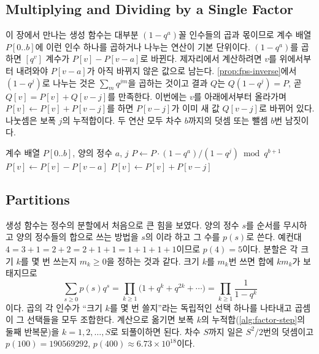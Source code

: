 \subsection{Multiplying and Dividing by a Single Factor}

이 장에서 만나는 생성 함수는 대부분 $(1-q^a)$꼴 인수들의 곱과 몫이므로 계수 배열 $P[0..b]$에 이런 인수 하나를 곱하거나 나누는 연산이 기본 단위이다. $(1-q^a)$를 곱하면 $[q^v]$ 계수가 $P[v]-P[v-a]$로 바뀐다. 제자리에서 계산하려면 $v$를 위에서부터 내려와야 $P[v-a]$가 아직 바뀌지 않은 값으로 남는다. \cref{prop:fps-inverse}에서 $(1-q^j)$로 나누는 것은 $\sum_mq^{jm}$을 곱하는 것이고 결과 $Q$는 $Q(1-q^j)=P$, 곧 $Q[v]=P[v]+Q[v-j]$를 만족한다. 이번에는 $v$를 아래에서부터 올라가며 $P[v]\gets P[v]+P[v-j]$를 하면 $P[v-j]$가 이미 새 값 $Q[v-j]$로 바뀌어 있다. 나눗셈은 보폭 $j$의 누적합이다. 두 연산 모두 차수 $b$까지의 덧셈 또는 뺄셈 $b$번 남짓이다.

\begin{algorithm}[htbp]
\begin{algorithmic}[1]
\Require 계수 배열 $P[0..b]$, 양의 정수 $a$, $j$
\Ensure $P\gets P\cdot(1-q^a)/(1-q^j)\bmod q^{b+1}$
 
  \State $P[v]\gets P[v]-P[v-a]$
\EndFor
{} 
  \State $P[v]\gets P[v]+P[v-j]$
\EndFor
\end{algorithmic}
\caption{$(1-q^a)/(1-q^j)$를 제자리에서 곱하기 (stardust 의 )}
\label{alg:factor-step}
\end{algorithm}

\subsection{Partitions}

생성 함수는 정수의 분할에서 처음으로 큰 힘을 보였다. 양의 정수 $s$를 순서를 무시하고 양의 정수들의 합으로 쓰는 방법을 $s$의 이라 하고 그 수를 $p(s)$로 쓴다. 예컨대 $4=3+1=2+2=2+1+1=1+1+1+1$이므로 $p(4)=5$이다. 분할은 각 크기 $k$를 몇 번 쓰는지 $m_k\ge0$을 정하는 것과 같다. 크기 $k$를 $m_k$번 쓰면 합에 $km_k$가 보태지므로
\[
\sum_{s\ge0}p(s)q^s=\prod_{k\ge1}\bigl(1+q^k+q^{2k}+\cdots\bigr)=\prod_{k\ge1}\frac1{1-q^k}
\]
이다. 곱의 각 인수가 ``크기 $k$를 몇 번 쓸지''라는 독립적인 선택 하나를 나타내고 곱셈이 그 선택들을 모두 조합한다. 계산으로 옮기면 보폭 $k$의 누적합(\cref{alg:factor-step}의 둘째 반복문)을 $k=1,2,\dots,S$로 되풀이하면 된다. 차수 $S$까지 일은 $S^2/2$번의 덧셈이고 $p(100)=190569292$, $p(400)\approx6.73\times10^{18}$이다.

